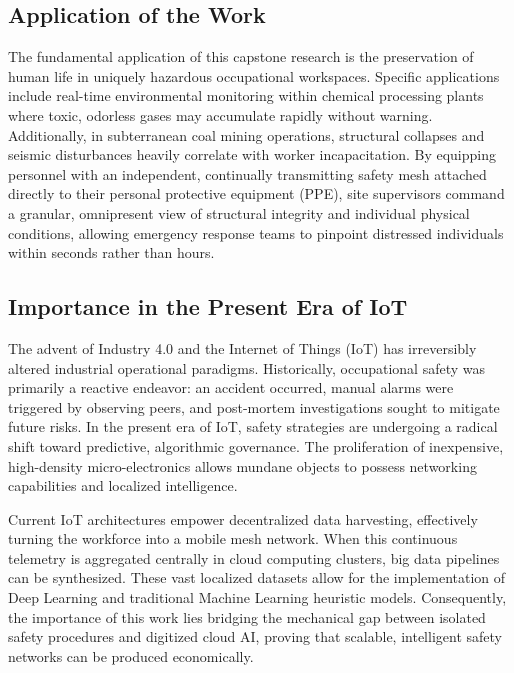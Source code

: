 \documentclass[11pt, conference, a4paper]{IEEEtran}
\begin{document}
\subsection{Application of the Work}
The fundamental application of this capstone research is the preservation of human life in uniquely hazardous occupational workspaces. Specific applications include real-time environmental monitoring within chemical processing plants where toxic, odorless gases may accumulate rapidly without warning. Additionally, in subterranean coal mining operations, structural collapses and seismic disturbances heavily correlate with worker incapacitation. By equipping personnel with an independent, continually transmitting safety mesh attached directly to their personal protective equipment (PPE), site supervisors command a granular, omnipresent view of structural integrity and individual physical conditions, allowing emergency response teams to pinpoint distressed individuals within seconds rather than hours.

\subsection{Importance in the Present Era of IoT}
The advent of Industry 4.0 and the Internet of Things (IoT) has irreversibly altered industrial operational paradigms. Historically, occupational safety was primarily a reactive endeavor: an accident occurred, manual alarms were triggered by observing peers, and post-mortem investigations sought to mitigate future risks. In the present era of IoT, safety strategies are undergoing a radical shift toward predictive, algorithmic governance. The proliferation of inexpensive, high-density micro-electronics allows mundane objects to possess networking capabilities and localized intelligence.

Current IoT architectures empower decentralized data harvesting, effectively turning the workforce into a mobile mesh network. When this continuous telemetry is aggregated centrally in cloud computing clusters, big data pipelines can be synthesized. These vast localized datasets allow for the implementation of Deep Learning and traditional Machine Learning heuristic models. Consequently, the importance of this work lies bridging the mechanical gap between isolated safety procedures and digitized cloud AI, proving that scalable, intelligent safety networks can be produced economically.
\end{document}
